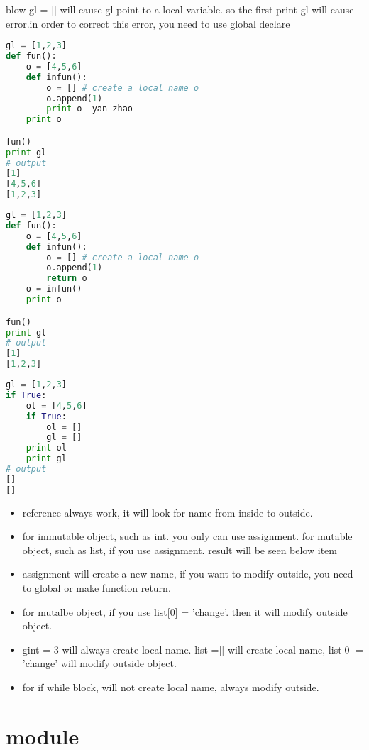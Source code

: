 \documentclass[a4paper,12pt,twoside]{book}
\begin{document}
blow gl = [] will cause gl point to a local variable. so the first print gl will cause error.in order to correct this error, you need to use global declare

\begin{lstlisting}[frame=single, language=python]
gl = [1,2,3]
def fun():
	o = [4,5,6]
	def infun():
		o = [] # create a local name o
		o.append(1)
		print o  yan zhao
	print o

fun()
print gl
# output 
[1]
[4,5,6]
[1,2,3]
\end{lstlisting}  

\begin{lstlisting}[frame=single, language=python]
gl = [1,2,3]
def fun():
	o = [4,5,6]
	def infun():
		o = [] # create a local name o
		o.append(1)
		return o
	o = infun()
	print o

fun()
print gl
# output 
[1]
[1,2,3]
\end{lstlisting}  


\begin{lstlisting}[frame=single, language=python]
gl = [1,2,3]
if True:
	ol = [4,5,6]
	if True:
		ol = []
		gl = []
	print ol
	print gl
# output 
[]
[]
\end{lstlisting}  





\begin{itemize}
		\item reference always work, it will look for name from inside to outside.
		\item for immutable object, such as int. you only can use assignment. for mutable object, such as list, if you use assignment. result will be seen below item
		\item assignment will create a new name, if you want to modify outside, you need to global or make function return.
		\item for mutalbe object, if you use list[0] = 'change'. then it will modify outside object.
		\item gint = 3 will always create local name. list =[] will create local name, list[0] = 'change' will modify outside object.
		\item for if while block, will not create local name, always modify outside. 
\end{itemize}

\section{module}
\end{document}
